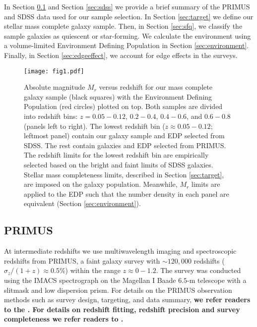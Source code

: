 \documentclass{emulateapj}
\begin{document}
In Section \ref{sec:primus} and Section \ref{sec:sdss} we provide a
brief summary of the PRIMUS and SDSS data used for our sample
selection. In Section \ref{sec:target} we define our stellar mass complete galaxy sample.  
Then, in Section \ref{sec:sfq}, we classify the sample galaxies as quiescent or star-forming. 
We calculate the environment
using a volume-limited Environment Defining Population in Section
\ref{sec:environment}.  Finally, in Section \ref{sec:edgeeffect}, we
account for edge effects in the surveys.

\begin{figure*}
    \begin{center}
        \leavevmode
	\texttt{[image: fig1.pdf]}
        \caption{Absolute magnitude $M_{r}$ versus redshift for our mass complete galaxy sample (black squares) with the Environment Defining Population (red circles) plotted on top. Both samples are divided into redshift bins: $z = 0.05-0.12$, $0.2-0.4$, $0.4-0.6$, and $0.6-0.8$ (panels left to right). The lowest redshift bin ($z \approx 0.05-0.12$; leftmost panel) contain our galaxy sample and EDP selected from SDSS. The rest contain galaxies and EDP selected from PRIMUS. The redshift limits for the lowest redshift bin are empirically selected based on the bright and faint limits of SDSS galaxies. Stellar mass completeness limits, described in Section \ref{sec:target}, are imposed on the galaxy population. Meanwhile, $M_{r}$ limits are applied to the EDP such that the number density in each panel are equivalent (Section \ref{sec:environment}).} \label{fig:targetEDP}
    \end{center}
\end{figure*}
\subsection{PRIMUS} \label{sec:primus}
At intermediate redshifts we use multiwavelength imaging and
spectroscopic redshifts from PRIMUS, a faint galaxy survey with $\sim
120,000$ redshifts ($\sigma_z/(1+z) \approx 0.5 \%$) within the range
$z \approx 0-1.2$. The survey was conducted using the IMACS
spectrograph on the Magellan I Baade $6.5$-m telescope with a slitmask and low dispersion prism. For details on the PRIMUS observation methods such as survey design, targeting, and data summary, {\bf we refer readers to the \cite{Coil:2011aa}. For details on redshift fitting, redshift precision and survey completeness we refer readers to \cite{Cool:2013aa}.}
\end{document}
